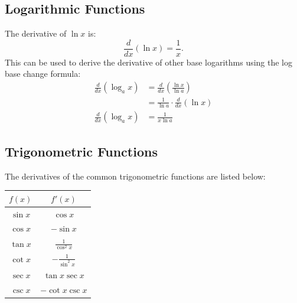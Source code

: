 \documentclass[12pt]{article}
\begin{document}
\subsection{Logarithmic Functions}
The derivative of $\ln x$ is:
\[ \frac{d}{dx} (\ln x) = \frac{1}{x}. \]
This can be used to derive the derivative of other base logarithms using the log base change formula:
\begin{align*}
	\frac{d}{dx} (\log_a x) &= \frac{d}{dx} \left( \frac{\ln x}{\ln a} \right) \\[5pt]
	&= \frac{1}{\ln a} \cdot \frac{d}{dx} (\ln x) \\[5pt]
	\frac{d}{dx} (\log_a x) &= \frac{1}{x \ln a}
\end{align*}

\subsection{Trigonometric Functions}
\label{sec:deriv_trig_funcs}
The derivatives of the common trigonometric functions are listed below:
\begin{center}
	\begin{tabular}{|c|c|}
		\hline
		$f(x)$ & $f'(x)$ \\
		\hline \hline
		$\sin{x}$ & $\cos{x}$ \\
		\hline
		$\cos{x}$ & $-\sin{x}$ \\
		\hline
		$\tan{x}$ & $\frac{1}{\cos^2{x}}$ \\
		\hline \hline
		$\cot{x}$ & $-\frac{1}{\sin^2{x}}$ \\
		\hline
		$\sec{x}$ & $\tan{x} \sec{x}$ \\
		\hline
		$\csc{x}$ & $-\cot{x} \csc{x}$ \\
		\hline
	\end{tabular}
\end{center}
\end{document}
